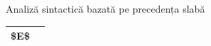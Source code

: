 \documentclass[pdf]{beamer}
\begin{document}
\begin{frame}{Analiză sintactică bazată pe precedența slabă}
\begin{minipage}{0.65\textwidth}
\begin{tabular}{p{3cm} p{3cm}}
    \hline

    \hline
        \$E\$& \\
    \hline
    \hline
    \end{tabular}
\end{minipage}%
\end{frame}
\end{document}
